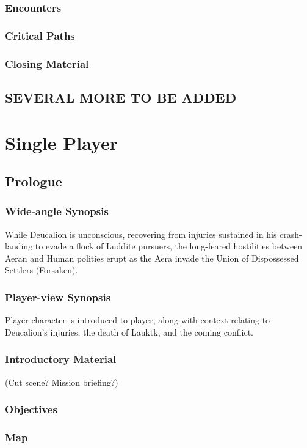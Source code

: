 \subsubsection{Encounters}
\subsubsection{Critical Paths}
\subsubsection{Closing Material}

\subsection{SEVERAL MORE TO BE ADDED}

\section{Single Player}
\subsection{Prologue}
\subsubsection{Wide-angle Synopsis}
While Deucalion is unconscious, recovering from injuries sustained in his crash-landing to evade a flock of Luddite pursuers, the long-feared hostilities between Aeran and Human polities erupt as the Aera invade the Union of Dispossessed Settlers (Forsaken).
\subsubsection{Player-view Synopsis}
Player character is introduced to player, along with context relating to Deucalion's injuries, the death of Lauktk, and the coming conflict.
\subsubsection{Introductory Material}
 (Cut scene?  Mission briefing?)
\subsubsection{Objectives}
\subsubsection{Map}
